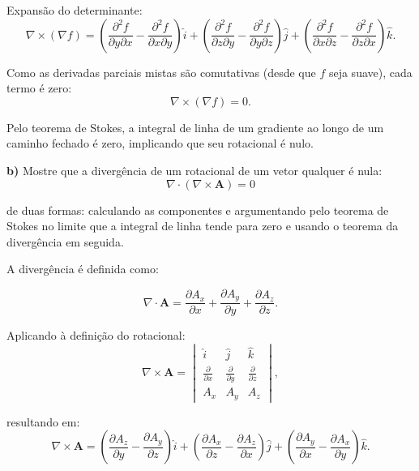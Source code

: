 \documentclass[a4paper,12pt]{article}
\begin{document}
Expansão do determinante:
\begin{equation}
    \nabla \times (\nabla f) = 
    \left( \frac{\partial^2 f}{\partial y \partial x} - \frac{\partial^2 f}{\partial x \partial y} \right) \hat{i} + 
    \left( \frac{\partial^2 f}{\partial z \partial y} - \frac{\partial^2 f}{\partial y \partial z} \right) \hat{j} + 
    \left( \frac{\partial^2 f}{\partial x \partial z} - \frac{\partial^2 f}{\partial z \partial x} \right) \hat{k}.
\end{equation}

Como as derivadas parciais mistas são comutativas (desde que $f$ seja suave), cada termo é zero:
\begin{equation}
    \nabla \times (\nabla f) = 0.
\end{equation}

Pelo teorema de Stokes, a integral de linha de um gradiente ao longo de um caminho fechado é zero, implicando que seu rotacional é nulo.

\textbf{b)} Mostre que a divergência de um rotacional de um vetor qualquer é nula:
\begin{equation}
    \nabla \cdot (\nabla \times \mathbf{A}) = 0
\end{equation}

de duas formas: calculando as componentes e argumentando pelo teorema de Stokes no limite que a integral de linha tende para zero e usando o teorema da divergência em seguida.

A divergência é definida como:

\begin{equation}
    \nabla \cdot \mathbf{A} = \frac{\partial A_x}{\partial x} + \frac{\partial A_y}{\partial y} + \frac{\partial A_z}{\partial z}.
\end{equation}

Aplicando à definição do rotacional:
\begin{equation}
    \nabla \times \mathbf{A} = 
    \begin{vmatrix} 
        \hat{i} & \hat{j} & \hat{k} \\
        \frac{\partial}{\partial x} & \frac{\partial}{\partial y} & \frac{\partial}{\partial z} \\
        A_x & A_y & A_z 
    \end{vmatrix},
\end{equation}

resultando em:
\begin{equation}
    \nabla \times \mathbf{A} = 
    \left( \frac{\partial A_z}{\partial y} - \frac{\partial A_y}{\partial z} \right) \hat{i} + 
    \left( \frac{\partial A_x}{\partial z} - \frac{\partial A_z}{\partial x} \right) \hat{j} + 
    \left( \frac{\partial A_y}{\partial x} - \frac{\partial A_x}{\partial y} \right) \hat{k}.
\end{equation}
\end{document}
